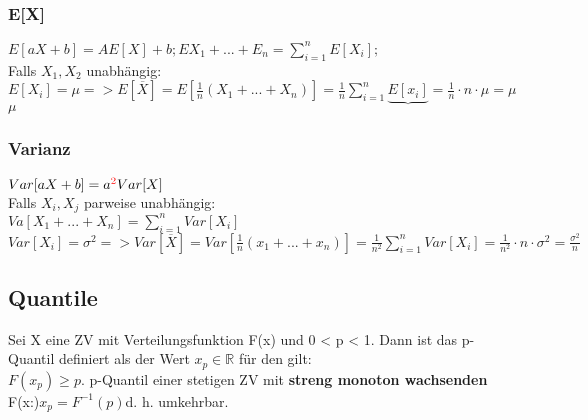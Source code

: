 \subsubsection{E[X]}
$E[aX + b] = AE[X]+b;E{X_{1}+ ...+ E_{n}} = \sum_{i=1}^{n} E[X_{i}];$\\
Falls $X_{1}, X_{2}$ unabhängig:\\
$E[X_{i}] = \mu => E[\overline{X}] = E[\frac{1}{n}(X_{1} + ...+ X_{n})] =  \frac{1}{n}\sum_{i=1}^{n} \underbrace{E[x_{i}]} = \frac{1}{n}\cdot n \cdot \mu = \mu$\\
$\mu$\\
\subsubsection{Varianz}
$Var[aX + b] = a\textcolor{red}{^2}Var[X]$\\
Falls $X_{i}, X_{j}$ parweise unabhängig:\\
$Va[X_{1} + ... + X_{n}] = \sum_{i=1}^{n} Var[X_{i}]$\\
$Var[X_{i}] = \sigma^2 => Var[\overline{X}] = Var[\frac{1}{n}(x_{1} + ... + x_{n})] = \frac{1}{n^2} \sum_{i=1}^{n} Var[X_{i}] = \frac{1}{n^2} \cdot n \cdot \sigma^2 = \frac{\sigma^2}{n}$
\subsection{Quantile}
Sei X eine ZV mit Verteilungsfunktion F(x) und 0 < p < 1. Dann ist das p-Quantil definiert als der Wert $x_{p} \in \mathbb{R}$ für den gilt:\\
$F(x_{p}) \ge p.$ p-Quantil einer stetigen ZV mit \textbf{streng monoton wachsenden} F(x:)$x_{p} = F^{-1}(p)$d. h. umkehrbar.